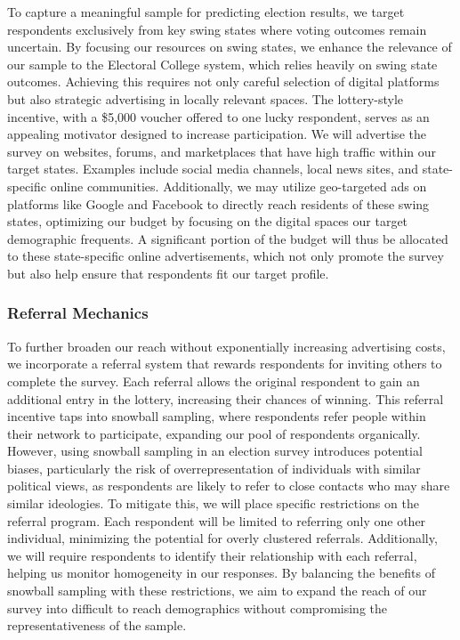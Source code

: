 \documentclass[
  letterpaper,
  DIV=11,
  numbers=noendperiod]{scrartcl}
\begin{document}
To capture a meaningful sample for predicting election results, we
target respondents exclusively from key swing states where voting
outcomes remain uncertain. By focusing our resources on swing states, we
enhance the relevance of our sample to the Electoral College system,
which relies heavily on swing state outcomes. Achieving this requires
not only careful selection of digital platforms but also strategic
advertising in locally relevant spaces. The lottery-style incentive,
with a \$5,000 voucher offered to one lucky respondent, serves as an
appealing motivator designed to increase participation. We will
advertise the survey on websites, forums, and marketplaces that have
high traffic within our target states. Examples include social media
channels, local news sites, and state-specific online communities.
Additionally, we may utilize geo-targeted ads on platforms like Google
and Facebook to directly reach residents of these swing states,
optimizing our budget by focusing on the digital spaces our target
demographic frequents. A significant portion of the budget will thus be
allocated to these state-specific online advertisements, which not only
promote the survey but also help ensure that respondents fit our target
profile.

\hypertarget{referral-mechanics}{%
\subsubsection{Referral Mechanics}\label{referral-mechanics}}

To further broaden our reach without exponentially increasing
advertising costs, we incorporate a referral system that rewards
respondents for inviting others to complete the survey. Each referral
allows the original respondent to gain an additional entry in the
lottery, increasing their chances of winning. This referral incentive
taps into snowball sampling, where respondents refer people within their
network to participate, expanding our pool of respondents organically.
However, using snowball sampling in an election survey introduces
potential biases, particularly the risk of overrepresentation of
individuals with similar political views, as respondents are likely to
refer to close contacts who may share similar ideologies. To mitigate
this, we will place specific restrictions on the referral program. Each
respondent will be limited to referring only one other individual,
minimizing the potential for overly clustered referrals. Additionally,
we will require respondents to identify their relationship with each
referral, helping us monitor homogeneity in our responses. By balancing
the benefits of snowball sampling with these restrictions, we aim to
expand the reach of our survey into difficult to reach demographics
without compromising the representativeness of the sample.
\end{document}
